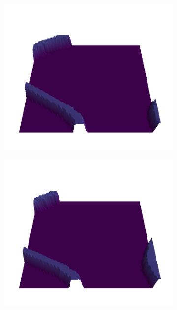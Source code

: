 \documentclass[../document.tex]{subfiles}
\begin{document}
\begin{figure}[H]
    \centering
    \begin{subfigure}[b]{0.19\textwidth}
        \includegraphics[width=\linewidth]{../img/bars1-example-patches/3d-viridis/0.png}
    \end{subfigure}
    \begin{subfigure}[b]{0.19\textwidth}
    \includegraphics[width=\linewidth]{../img/bars1-example-patches/3d-viridis/2.png}    \end{subfigure}  

\end{figure}
\end{document}
